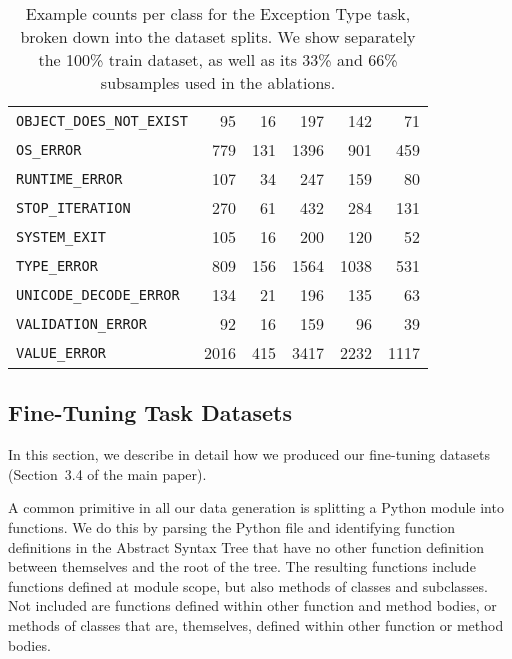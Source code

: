 \documentclass{article}
\begin{document}
\begin{table*}
\begin{tabular}{|l|r|r|rrr|}
\verb+OBJECT_DOES_NOT_EXIST+&	\num{95}&	\num{16}&	\num{197}&	\num{142}&	\num{71}\\
\verb+OS_ERROR+&	\num{779}&	\num{131}&	\num{1396}&	\num{901}&	\num{459}\\
\verb+RUNTIME_ERROR+&	\num{107}&	\num{34}&	\num{247}&	\num{159}&	\num{80}\\
\verb+STOP_ITERATION+&	\num{270}&	\num{61}&	\num{432}&	\num{284}&	\num{131}\\
\verb+SYSTEM_EXIT+&	\num{105}&	\num{16}&	\num{200}&	\num{120}&	\num{52}\\
\verb+TYPE_ERROR+&	\num{809}&	\num{156}&	\num{1564}&	\num{1038}&	\num{531}\\
\verb+UNICODE_DECODE_ERROR+&	\num{134}&	\num{21}&	\num{196}&	\num{135}&	\num{63}\\
\verb+VALIDATION_ERROR+&	\num{92}&	\num{16}&	\num{159}&	\num{96}&	\num{39}\\
\verb+VALUE_ERROR+&	\num{2016}&	\num{415}&	\num{3417}&	\num{2232}&	\num{1117}\\
\hline
\end{tabular}

\caption{Example counts per class for the Exception Type task, broken down into the dataset splits. We show separately the 100\% train dataset, as well as its 33\% and 66\% subsamples used in the ablations.}
\label{tab:exceptionclasses}
\end{table*}





\subsection{{Fine-Tuning Task Datasets}}
In this section, we describe in detail how we produced our fine-tuning datasets (Section~3.4 of the main paper).

A common primitive in all our data generation is splitting a Python module into functions. We do this by parsing the Python file and identifying function definitions in the Abstract Syntax Tree that have no other function definition between themselves and the root of the tree. The resulting functions include functions defined at module scope, but also methods of classes and subclasses. Not included are functions defined within other function and method bodies, or methods of classes that are, themselves, defined within other function or method bodies.
\end{document}
